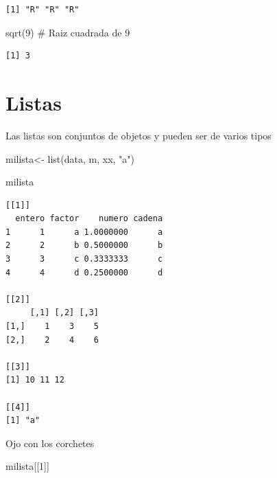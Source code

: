\documentclass[
  letterpaper,
  DIV=11,
  numbers=noendperiod]{scrreprt}
\newenvironment{Shaded}{\begin{snugshade}}{\end{snugshade}}
\newcommand{\CommentTok}[1]{\textcolor[rgb]{0.37,0.37,0.37}{#1}}
\newcommand{\DecValTok}[1]{\textcolor[rgb]{0.68,0.00,0.00}{#1}}
\newcommand{\FunctionTok}[1]{\textcolor[rgb]{0.28,0.35,0.67}{#1}}
\newcommand{\NormalTok}[1]{\textcolor[rgb]{0.00,0.23,0.31}{#1}}
\newcommand{\OtherTok}[1]{\textcolor[rgb]{0.00,0.23,0.31}{#1}}
\newcommand{\StringTok}[1]{\textcolor[rgb]{0.13,0.47,0.30}{#1}}
\begin{document}
\begin{verbatim}
[1] "R" "R" "R"
\end{verbatim}

\begin{Shaded}
\begin{Highlighting}[]
\FunctionTok{sqrt}\NormalTok{(}\DecValTok{9}\NormalTok{)           }\CommentTok{\# Raiz cuadrada de 9}
\end{Highlighting}
\end{Shaded}

\begin{verbatim}
[1] 3
\end{verbatim}

\hypertarget{listas}{%
\section{Listas}\label{listas}}

Las listas son conjuntos de objetos y pueden ser de varios tipos

\begin{Shaded}
\begin{Highlighting}[]
\NormalTok{milista}\OtherTok{\textless{}{-}} \FunctionTok{list}\NormalTok{(data, m, xx, }\StringTok{"a"}\NormalTok{)}
\end{Highlighting}
\end{Shaded}

\begin{Shaded}
\begin{Highlighting}[]
\NormalTok{milista}
\end{Highlighting}
\end{Shaded}

\begin{verbatim}
[[1]]
  entero factor    numero cadena
1      1      a 1.0000000      a
2      2      b 0.5000000      b
3      3      c 0.3333333      c
4      4      d 0.2500000      d

[[2]]
     [,1] [,2] [,3]
[1,]    1    3    5
[2,]    2    4    6

[[3]]
[1] 10 11 12

[[4]]
[1] "a"
\end{verbatim}

Ojo con los corchetes

\begin{Shaded}
\begin{Highlighting}[]
\NormalTok{milista[[}\DecValTok{1}\NormalTok{]]}
\end{Highlighting}
\end{Shaded}
\end{document}

